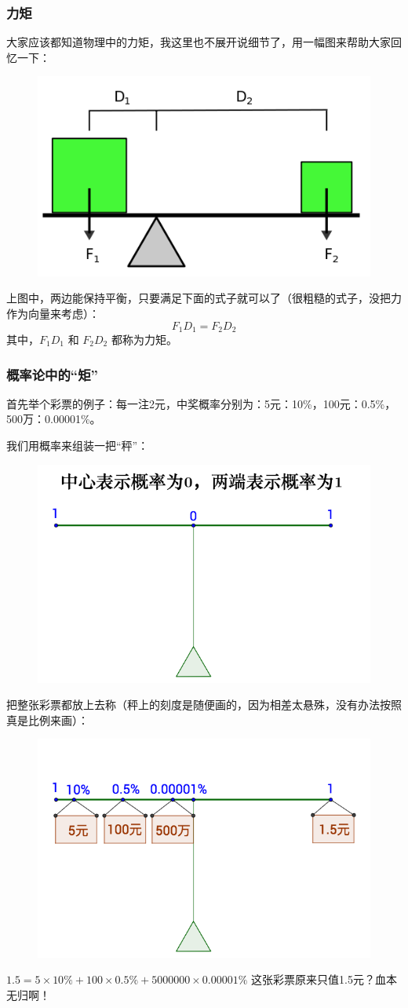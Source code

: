\documentclass[12pt]{article}
\begin{document}
\subsubsection{力矩}
大家应该都知道物理中的力矩，我这里也不展开说细节了，用一幅图来帮助大家回忆一下：
\begin{figure}[H]
  \centering
  \includegraphics[width=.5\textwidth]{fig/MomentInForce.png} 
\end{figure}
上图中，两边能保持平衡，只要满足下面的式子就可以了（很粗糙的式子，没把力作为向量来考虑）：
$$
F_1D_1 = F_2D_2
$$
其中，$F_1D_1$ 和 $F_2D_2$ 都称为力矩。

\subsubsection{概率论中的“矩”}
首先举个彩票的例子：每一注2元，中奖概率分别为：5元：10\%，100元：0.5\%，500万：0.00001\%。

我们用概率来组装一把“秤”：
\begin{figure}[H]
  \centering
  \includegraphics[width=.5\textwidth]{fig/MomentInLottery.png} 
\end{figure}
把整张彩票都放上去称（秤上的刻度是随便画的，因为相差太悬殊，没有办法按照真是比例来画）：
\begin{figure}[H]
  \centering
  \includegraphics[width=.5\textwidth]{fig/MomentInLottery2.png} 
\end{figure}
$1.5=5\times10\%+100\times0.5\%+5000000\times0.00001\%$ 这张彩票原来只值1.5元？血本无归啊！
\end{document}
